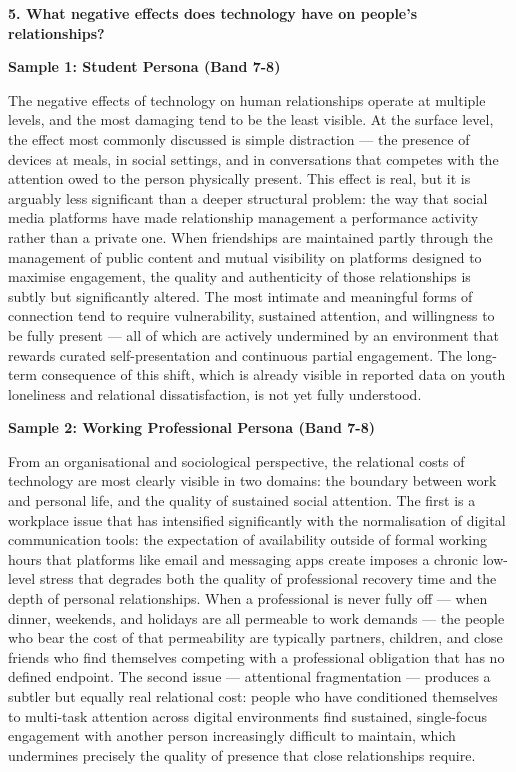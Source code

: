 \separator

\begin{ieltsquestion}
\textbf{5. What negative effects does technology have on people's relationships?}
\end{ieltsquestion}
\textbf{Sample 1: Student Persona (Band 7-8)}

The negative effects of technology on human relationships operate at multiple levels, and the most damaging tend to be the least visible. At the surface level, the effect most commonly discussed is simple distraction — the presence of devices at meals, in social settings, and in conversations that competes with the attention owed to the person physically present. This effect is real, but it is arguably less significant than a deeper structural problem: the way that social media platforms have made relationship management a performance activity rather than a private one. When friendships are maintained partly through the management of public content and mutual visibility on platforms designed to maximise engagement, the quality and authenticity of those relationships is subtly but significantly altered. The most intimate and meaningful forms of connection tend to require vulnerability, sustained attention, and willingness to be fully present — all of which are actively undermined by an environment that rewards curated self-presentation and continuous partial engagement. The long-term consequence of this shift, which is already visible in reported data on youth loneliness and relational dissatisfaction, is not yet fully understood.

\textbf{Sample 2: Working Professional Persona (Band 7-8)}

From an organisational and sociological perspective, the relational costs of technology are most clearly visible in two domains: the boundary between work and personal life, and the quality of sustained social attention. The first is a workplace issue that has intensified significantly with the normalisation of digital communication tools: the expectation of availability outside of formal working hours that platforms like email and messaging apps create imposes a chronic low-level stress that degrades both the quality of professional recovery time and the depth of personal relationships. When a professional is never fully off — when dinner, weekends, and holidays are all permeable to work demands — the people who bear the cost of that permeability are typically partners, children, and close friends who find themselves competing with a professional obligation that has no defined endpoint. The second issue — attentional fragmentation — produces a subtler but equally real relational cost: people who have conditioned themselves to multi-task attention across digital environments find sustained, single-focus engagement with another person increasingly difficult to maintain, which undermines precisely the quality of presence that close relationships require.

